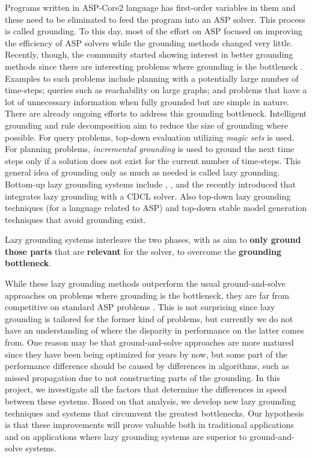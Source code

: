 \documentclass[a4paper,11pt]{article}
\newcommand{\alphasolver}{\logicname{alpha}}
\newcommand{\Omiga}{\logicname{Omiga}}
\newcommand{\GASP}{\logicname{GASP}}
\newcommand{\ASPeRiX}{\logicname{ASPeRiX}}
\begin{document}
Programs written in ASP-Core2 language has  first-order variables in them and these need to be eliminated to feed the program into an ASP solver. This process is called grounding. To this day, most of the effort on ASP focused on improving the efficiency of ASP solvers while the grounding methods changed very little. Recently, though, the community started showing interest in better grounding methods since there are interesting problems where grounding is the bottleneck \cite{lpnmr/BalducciniLS13}. Examples to such problems include planning with a potentially large number of time-steps; queries such as reachability on large graphs; and problems that have a lot of unnecessary information when fully grounded but are simple in nature. There are already ongoing efforts to address this grounding bottleneck. Intelligent grounding \cite{ia/CalimeriFPZ17} and rule decomposition \cite{lopstr/BichlerMW16} aim to reduce the size of grounding where possible. For query problems, top-down evaluation utilizing \emph{magic sets} \cite{pods/BancilhonMSU86,ai/AlvianoFGL12} is used. For planning problems, \emph{incremental grounding} \cite{aicom/GebserSS11} is used to ground the next time steps only if a solution does not exist for the current number of time-steps. This general idea of grounding only as much as needed is called lazy grounding. Bottom-up lazy grounding systems include \Omiga {}, \GASP {}, \ASPeRiX {} and the recently introduced \alphasolver {} that integrates lazy grounding with a CDCL solver. Also top-down lazy grounding techniques (for a language related to ASP)  and top-down stable model generation techniques that avoid grounding  \cite{lopstr/MarpleG12,corr/MarpleSG17} exist.

\begin{framefloat}[ht]
Lazy grounding systems interleave the two phases, with as aim to \textbf{only ground those parts} that are \textbf{relevant} for the solver, to overcome the \textbf{grounding bottleneck}.
\end{framefloat}

While these lazy grounding methods outperform the usual ground-and-solve approaches on problems where grounding is the bottleneck, they are far from competitive on standard ASP problems \cite{jair/GebserMR17}. This is not surprising since lazy grounding is tailored for the former kind of problems, but currently we do not have an understanding of where the disparity in performance on the latter comes from. One reason may be that ground-and-solve approaches are more matured since they have been being optimized for years by now, but some part of the performance difference should be caused by differences in algorithms, such as missed propagation due to not constructing parts of the grounding. In this project, we investigate all the factors that determine the differences in speed between these systems. Based on that analysis, we develop new lazy grounding techniques and systems that circumvent the greatest bottlenecks. Our hypothesis is that these improvements will prove valuable both in traditional applications and on applications where lazy grounding systems are superior to ground-and-solve systems.
\end{document}
